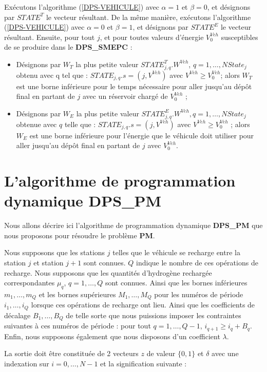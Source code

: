 Exécutons l'algorithme (\ref{DPS-VEHICULE}) avec $\alpha= 1$ et $\beta = 0$, et désignons par $STATE^T$ le vecteur résultant.
De la même manière, exécutons l'algorithme (\ref{DPS-VEHICULE}) avec $\alpha = 0$ et $\beta = 1$, et désignons par $STATE^E$ le vecteur résultant. Ensuite, pour tout $j$, et pour toutes valeurs d'énergie $V_0^{Veh}$ susceptibles de se produire dans le \textbf{DPS\_SMEPC} : 
\begin{itemize}[label=$\square$]
	\item Désignons par $W_T$ la plus petite valeur $STATE^T _{j, q}.W^{Veh}$, $q = 1, \dots, NState_j$ obtenu avec q tel que : $STATE_{j, q}.s = (j, V^{Veh})$ avec $V^{Veh} \geq V_0^{Veh} $; alors $W_T$ est une borne inférieure pour le temps nécessaire pour aller jusqu'au dépôt final en partant de $j$ avec un réservoir chargé de $V_0^{Veh}$ ;
	\item Désignons par $W_E$ la plus petite valeur $STATE^E _{j, q}.W^{Veh}, q = 1, \dots, NState_j$ obtenue avec $q$ telle que : $STATE_{j, q}.s = (j, V^{Veh})$ avec $V^{Veh} \geq V_0^{Veh}$ ; alors $W_E$ est une borne inférieure pour l'énergie que le véhicule doit utiliser pour aller jusqu'au dépôt final en partant de $j$ avec $V_0^{Veh}$.
\end{itemize}

\section{L'algorithme de programmation dynamique DPS\_PM}
\label{algo_PM}
Nous allons décrire ici l'algorithme de programmation dynamique \textbf{DPS\_PM} que nous proposons pour résoudre le problème \textbf{PM}.

Nous supposons que les stations $j$ telles que le véhicule se recharge entre la station $j$ et station $j+1$ sont connues. $Q$ indique le nombre de ces opérations de recharge. Nous supposons que les quantités d'hydrogène rechargée correspondantes $\mu_q$, $q = 1, \dots, Q$ sont connues. Ainsi que les bornes inférieures $m_1, \dots,m_Q$ et les bornes supérieures $M_1, \dots,M_Q$ pour les numéros de période $i_1, \dots, i_Q$ lorsque ces opérations de recharge ont lieu. Ainsi que les coefficients de décalage $B_1, \dots, B_Q$ de telle sorte que nous puissions imposer les contraintes suivantes à ces numéros de période : pour tout $q = 1, \dots, Q-1$, $i_{q+1} \geq i_q + B_q$.
Enfin, nous supposons également que nous disposons d'un coefficient $\lambda$.

La sortie doit être constituée de 2 vecteurs $z$ de valeur $\{0,1\}$ et $\delta$ avec une indexation sur $i = 0, \dots,N-1$ et la signification suivante : 

